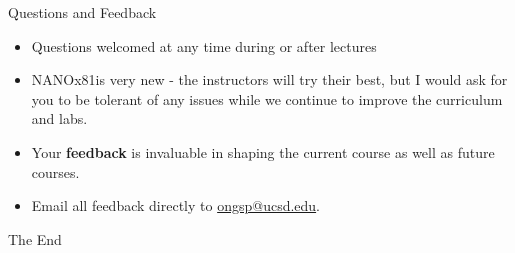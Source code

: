 \documentclass[aspectratio=169]{beamer}
\newcommand{\classname}{NANOx81}
\begin{document}
\begin{frame}{Questions and Feedback}
    \begin{itemize}
        \item Questions welcomed at any time during or after lectures
        \item \classname is very new - the instructors will try their best, but I would ask for you to be tolerant of any issues while we continue to improve the curriculum and labs.
        \item Your \textbf{feedback} is invaluable in shaping the current course as well as future courses. 
        \item Email all feedback directly to \href{mailto:ongsp@eng.ucsd.edu}{ongsp@ucsd.edu}.
    \end{itemize}
\end{frame}


\begin{frame}
    \Huge{\centerline{The End}}
\end{frame}
\end{document}
